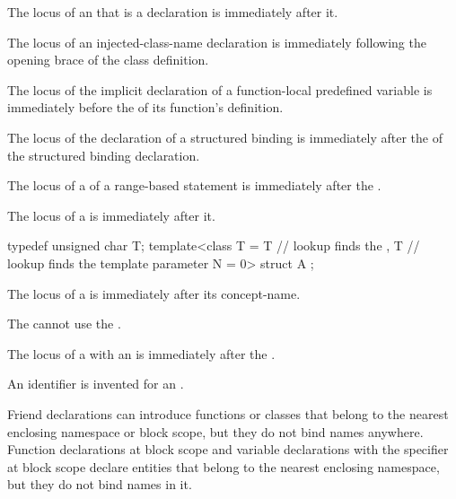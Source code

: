 \pnum
The locus of an 
that is a declaration is immediately after it.

\pnum
The locus of an injected-class-name declaration
is immediately following the opening brace of the class definition.

\pnum
The locus of the implicit declaration of
a function-local predefined variable
is immediately before
the  of its function's definition.

\pnum
The locus of the declaration of a structured binding
is immediately after
the  of the structured binding declaration.

\pnum
The locus of a 
of a range-based  statement
is immediately after the .

\pnum
The locus of a  is immediately after it.
\begin{example}
\begin{codeblock}
typedef unsigned char T;
template<class T
  = T               // lookup finds the 
  , T               // lookup finds the template parameter
    N = 0> struct A { };
\end{codeblock}
\end{example}

\pnum
The locus of a 
is immediately after its concept-name.
\begin{note}
The  cannot use
the .
\end{note}

\pnum
The locus of a 
with an 
is immediately after the .
\begin{note}
An identifier is invented
for an .
\end{note}

\pnum
\begin{note}
Friend declarations can introduce functions or classes
that belong to the nearest enclosing namespace or block scope,
but they do not bind names anywhere.
Function declarations at block scope and
variable declarations with the  specifier at block scope
declare entities
that belong to the nearest enclosing namespace,
but they do not bind names in it.
\end{note}

